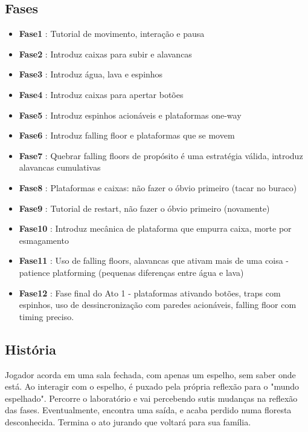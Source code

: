 \documentclass[a4paper, 11pt]{article}
\begin{document}
 
\subsection{Fases} 
 
	\begin{itemize} 
		\item \textbf{Fase1} : Tutorial de movimento, interação e pausa 
		\item \textbf{Fase2} : Introduz caixas para subir e alavancas
		\item \textbf{Fase3} : Introduz água, lava e espinhos
		\item \textbf{Fase4} : Introduz caixas para apertar botões
		\item \textbf{Fase5} : Introduz espinhos acionáveis e plataformas one-way
		\item \textbf{Fase6} : Introduz falling floor e plataformas que se movem
		\item \textbf{Fase7} : Quebrar falling floors de propósito é uma estratégia válida, introduz alavancas cumulativas
		\item \textbf{Fase8} : Plataformas e caixas: não fazer o óbvio primeiro (tacar no buraco)
		\item \textbf{Fase9} : Tutorial de restart, não fazer o óbvio primeiro (novamente)
		\item \textbf{Fase10} : Introduz mecânica de plataforma que empurra caixa, morte por esmagamento
		\item \textbf{Fase11} : Uso de falling floors, alavancas que ativam mais de uma coisa - patience platforming (pequenas diferenças entre água e lava)
		\item \textbf{Fase12} : Fase final do Ato 1 - plataformas ativando botões, traps com espinhos, uso de dessincronização com paredes acionáveis, falling floor com timing preciso.
	\end{itemize} 
 
\subsection{História} 
 
	Jogador acorda em uma sala fechada, com apenas um espelho, sem saber onde está. Ao interagir com o espelho, é puxado pela própria reflexão para o "mundo espelhado".
	Percorre o laboratório e vai percebendo sutis mudanças na reflexão das fases. Eventualmente, encontra uma saída, e acaba perdido numa floresta desconhecida. Termina o ato jurando que voltará para sua família.
\end{document}
